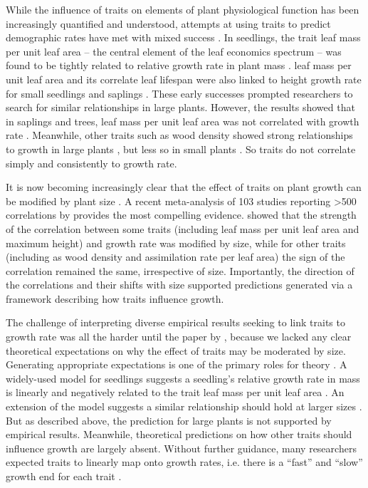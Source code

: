 \documentclass[a4paper,11pt]{article}
\begin{document}
While the influence of traits on elements of plant physiological function has been increasingly quantified and understood, attempts at using traits to predict demographic rates have met with mixed success \citep{Poorter-2006, Poorter-2008,Wright-2010,Herault-2011,Paine-2015}. In seedlings, the trait leaf mass per unit leaf area -- the central element of the leaf economics spectrum \citep{Wright-2004} -- was found to be tightly related to relative growth rate in plant mass \citep{Lambers-1992, Wright-2000}. leaf mass per unit leaf area and its correlate leaf lifespan were also linked to height growth rate for small seedlings and saplings \citep{Reich-1992, Poorter-2006}. These early successes prompted researchers to search for similar relationships in large plants. However, the results showed that in saplings and trees, leaf mass per unit leaf area was not correlated with growth rate \citep{Poorter-2008, Wright-2010, Herault-2011, Paine-2015}. Meanwhile, other traits such as wood density showed strong relationships to growth in large plants \citep{Wright-2010,Herault-2011}, but less so in small plants \citep{Castro-1998}. So traits do not correlate simply and consistently to growth rate.

It is now becoming increasingly clear that the effect of traits on plant growth can be modified by plant size \citep{Falster-2011, Ruger-2012, Iida-2014, Visser-2016, Gibert-2016}. A recent meta-analysis of 103 studies reporting \textgreater 500 correlations by \citet{Gibert-2016} provides the most compelling evidence. \citet{Gibert-2016} showed that the strength of the correlation between some traits (including leaf mass per unit leaf area and maximum height) and growth rate was modified by size, while for other traits (including as wood density and assimilation rate per leaf area) the sign of the correlation remained the same, irrespective of size. Importantly, the direction of the correlations and their shifts with size supported predictions generated via a framework describing how traits influence growth.

The challenge of interpreting diverse empirical results seeking to link traits to growth rate was all the harder until the paper by \citet{Gibert-2016}, because we lacked any clear theoretical expectations on why the effect of traits may be moderated by size. Generating appropriate expectations is one of the primary roles for theory \citep{Kokko-2007}. A widely-used model for seedlings suggests a seedling's relative growth rate in mass is linearly and negatively related to the trait leaf mass per unit leaf area \citep{Lambers-1992, Cornelissen-1996, Wright-2000}. An extension of the model suggests a similar relationship should hold at larger sizes \citep{Enquist-2007}. But as described above, the prediction for large plants is not supported by empirical results. Meanwhile, theoretical predictions on how other traits should influence growth are largely absent. Without further guidance, many researchers expected traits to linearly map onto growth rates, i.e. there is a ``fast'' and ``slow'' growth end for each trait \citep[e.g.][]{Grime-1977, Poorter-2008, Chave-2009, Paine-2015}.
\end{document}
